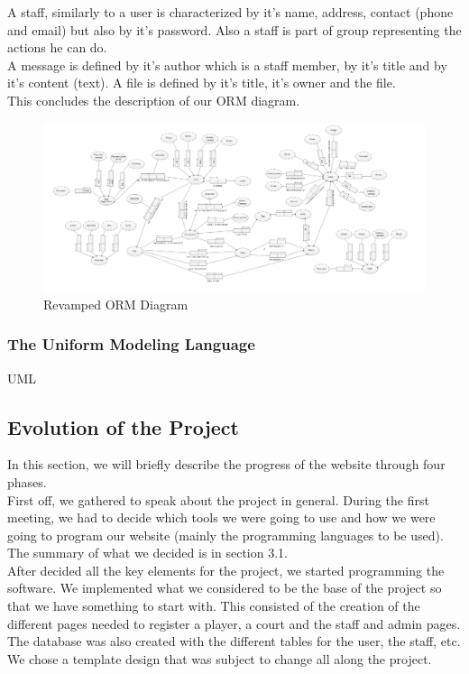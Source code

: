 \documentclass[a4paper, 12pt]{article}
\begin{document}
A staff, similarly to a user is characterized by it's name, address, contact (phone and email) but also by it's password. Also a staff is part of group representing the actions he can do. \\

A message is defined by it's author which is a staff member, by it's title and by it's content (text). A file is defined by it's title, it's owner and the file.\\

This concludes the description of our ORM diagram. 

\begin{figure}[ht!]
\caption{\label{orm2} Revamped ORM Diagram}
\includegraphics[scale=0.58, angle=90]{ormp2.PNG}
\end{figure}
\FloatBarrier


\subsubsection{The Uniform Modeling Language}
UML

\subsection{Evolution of the Project}

In this section, we will briefly describe the progress of the website through four phases.\\

First off, we gathered to speak about the project in general. During the first meeting, we had to decide which tools we were going to use and how we were going to program our website (mainly the programming languages to be used). The summary of what we decided is in section 3.1.\\

After decided all the key elements for the project, we started programming the software. We implemented what we considered to be the base of the project so that we have something to start with. This consisted of the creation of the different pages needed to register a player, a court and the staff and admin pages. The database was also created with the different tables for the user, the staff, etc. We chose a template design that was subject to change all along the project.\\
\end{document}
